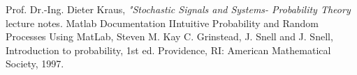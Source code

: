 \begin{thebibliography}{15}
 Prof. Dr.-Ing. Dieter Kraus,\textit{ "Stochastic Signals and Systems- Probability Theory} lecture notes.
 Matlab Documentation
 IIntuitive Probability and Random Processes Using MatLab, Steven M. Kay
 C. Grinstead, J. Snell and J. Snell, Introduction to probability, 1st ed. Providence, RI: American Mathematical Society, 1997.

\end{thebibliography}